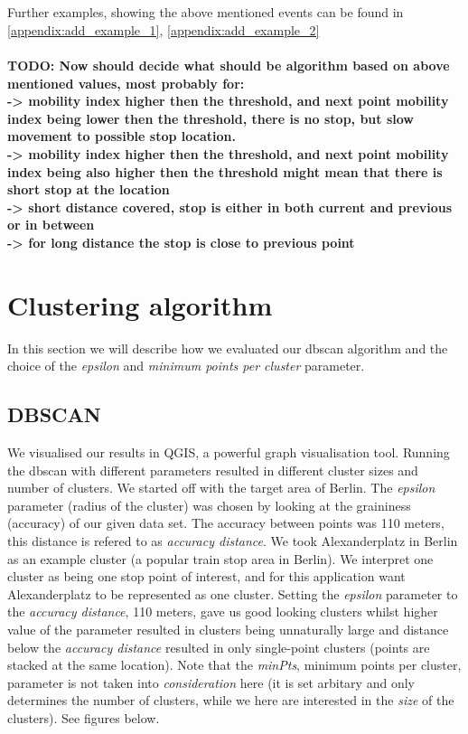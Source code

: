 \\\\
Further examples, showing the above mentioned events can be found in \autoref{appendix:add_example_1}, \autoref{appendix:add_example_2}
\\\\
\textbf{TODO: Now should decide what should be algorithm based on above mentioned values, most probably for:
\\-> mobility index higher then the threshold, and next point mobility index being lower then the threshold, there is no stop, but slow movement to possible stop location. 
\\-> mobility index higher then the threshold, and next point mobility index being also higher then the threshold might mean that there is short stop at the location
\\-> short distance covered, stop is either in both current and previous or in between
\\-> for long distance the stop is close to previous point}

\section{Clustering algorithm}

In this section we will describe how we evaluated our dbscan algorithm and the choice of the \textit{epsilon} and \textit{minimum points per cluster} parameter.

\subsection{DBSCAN}

We visualised our results in QGIS, a powerful graph visualisation tool. Running the dbscan with different parameters resulted in different cluster sizes and number of clusters. We started off with the target area of Berlin. The \textit{epsilon} parameter (radius of the cluster) was chosen by looking at the graininess (accuracy) of our given data set. The accuracy between points was 110 meters, this distance is refered to as \textit{accuracy distance}.
We took Alexanderplatz in Berlin as an example cluster (a popular train stop area in Berlin). We interpret one cluster as being one stop point of interest, and for this application want Alexanderplatz to be represented as one cluster. Setting the \textit{epsilon} parameter to the \textit{accuracy distance},  110 meters, gave us good looking clusters whilst higher value of the parameter resulted in clusters being unnaturally large and distance below the \textit{accuracy distance} resulted in only single-point clusters (points are stacked at the same location). Note that the \textit{minPts}, minimum points per cluster, parameter is not taken into \textit{consideration} here (it is set arbitary and only determines the number of clusters, while we here are interested in the \textit{size} of the clusters). See figures below.

